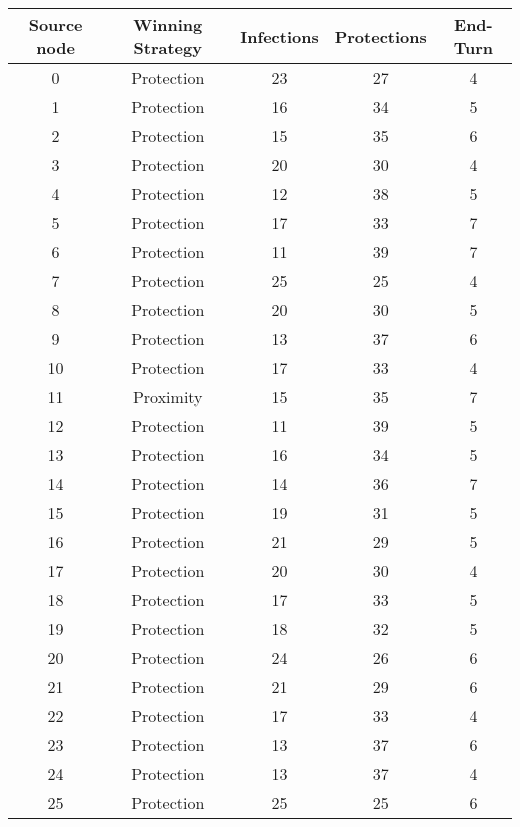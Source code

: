 \documentclass[results.tex]{subfiles}
\begin{document}
\begin{center}
  \begin{tabular}{| c || c | c | c | c |}
    \hline
    {\bfseries Source node} & {\bfseries Winning Strategy} & {\bfseries Infections} & {\bfseries Protections} & {\bfseries End-Turn} \\  %
    \hline\hline
    0 & Protection & 23 & 27 & 4 \\ 
    \hline
    1 & Protection & 16 & 34 & 5 \\ 
    \hline
    2 & Protection & 15 & 35 & 6 \\ 
    \hline
    3 & Protection & 20 & 30 & 4 \\ 
    \hline
    4 & Protection & 12 & 38 & 5 \\ 
    \hline
    5 & Protection & 17 & 33 & 7 \\ 
    \hline
    6 & Protection & 11 & 39 & 7 \\ 
    \hline
    7 & Protection & 25 & 25 & 4 \\ 
    \hline
    8 & Protection & 20 & 30 & 5 \\ 
    \hline
    9 & Protection & 13 & 37 & 6 \\ 
    \hline
    10 & Protection & 17 & 33 & 4 \\ 
    \hline
    11 & Proximity & 15 & 35 & 7 \\ 
    \hline
    12 & Protection & 11 & 39 & 5 \\ 
    \hline
    13 & Protection & 16 & 34 & 5 \\ 
    \hline
    14 & Protection & 14 & 36 & 7 \\ 
    \hline
    15 & Protection & 19 & 31 & 5 \\ 
    \hline
    16 & Protection & 21 & 29 & 5 \\ 
    \hline
    17 & Protection & 20 & 30 & 4 \\ 
    \hline
    18 & Protection & 17 & 33 & 5 \\ 
    \hline
    19 & Protection & 18 & 32 & 5 \\ 
    \hline
    20 & Protection & 24 & 26 & 6 \\ 
    \hline
    21 & Protection & 21 & 29 & 6 \\ 
    \hline
    22 & Protection & 17 & 33 & 4 \\ 
    \hline
    23 & Protection & 13 & 37 & 6 \\ 
    \hline
    24 & Protection & 13 & 37 & 4 \\ 
    \hline
    25 & Protection & 25 & 25 & 6 \\ 

\end{tabular}
\end{center}
\end{document}
